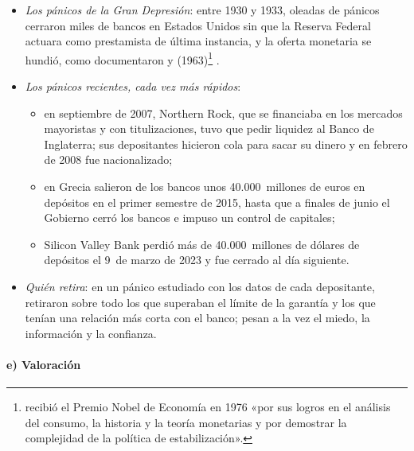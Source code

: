 \documentclass[11pt]{article}
\begin{document}
\begin{itemize}
\item \emph{Los pánicos de la Gran Depresión}: entre 1930 y 1933, oleadas de pánicos cerraron miles de bancos en Estados Unidos sin que la Reserva Federal actuara como prestamista de última instancia, y la oferta monetaria se hundió, como documentaron  y  (1963)\nocite{FriedmanSchwartz1963Monetary}\footnote{ recibió el Premio Nobel de Economía en 1976 «por sus logros en el análisis del consumo, la historia y la teoría monetarias y por demostrar la complejidad de la política de estabilización»\nocite{Nobel1976Friedman}.} .
\item \emph{Los pánicos recientes, cada vez más rápidos}:
  \begin{itemize}
  \item en septiembre de 2007, Northern Rock, que se financiaba en los mercados mayoristas y con titulizaciones, tuvo que pedir liquidez al Banco de Inglaterra; sus depositantes hicieron cola para sacar su dinero y en febrero de 2008 fue nacionalizado\nocite{BoE2007NorthernRock,FRBSL2026Cronologia};
  \item en Grecia salieron de los bancos unos 40.000~millones de euros en depósitos en el primer semestre de 2015, hasta que a finales de junio el Gobierno cerró los bancos e impuso un control de capitales\nocite{BCE2026BSIGrecia,BIS2017Stournaras};
  \item Silicon Valley Bank perdió más de 40.000~millones de dólares de depósitos el 9~de marzo de 2023 y fue cerrado al día siguiente\nocite{FED2023SVB}.
  \end{itemize}
\item \emph{Quién retira}: en un pánico estudiado con los datos de cada depositante, retiraron sobre todo los que superaban el límite de la garantía y los que tenían una relación más corta con el banco; pesan a la vez el miedo, la información y la confianza\nocite{IyerPuri2012}.
\end{itemize}

\paragraph{e) Valoración}
\end{document}
